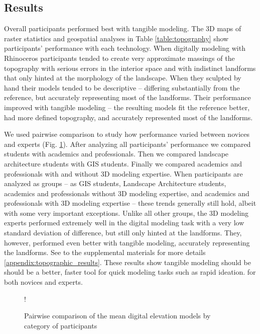 \documentclass[Afour,sagev,times]{sagej} %
\begin{document}
\subsection{Results}
Overall participants performed best with tangible modeling.
%
The 3D maps of raster statistics and geospatial analyses in
Table \ref{table:topography} 
show participants' performance with each technology.
%
When digitally modeling with Rhinoceros 
participants tended to 
create very approximate massings of the topography
with serious errors in the interior space and
with indistinct landforms
that only hinted at the morphology of the landscape.
%
When they sculpted by hand
their models tended to be descriptive -- 
differing substantially from the reference, but
accurately representing most of the landforms. 
%
Their performance improved 
with tangible modeling --
the resulting models
fit the reference better, 
had more defined topography, 
and accurately represented most of the landforms.

We used pairwise comparison to study 
how performance varied between 
novices and experts (Fig. \ref{fig:comparison}).
After analyzing all participants' performance
we compared students with academics and professionals. 
Then we compared landscape architecture students with GIS students.
Finally we compared academics and professionals 
with and without 3D modeling expertise.
%
When participants are analyzed as groups 
-- as GIS students, Landscape Architecture students, 
academics and professionals without 3D modeling expertise, 
and academics and professionals with 3D modeling expertise -- 
these trends generally still hold, 
albeit with some very important exceptions.
%
Unlike all other groups, 
the 3D modeling experts performed extremely well 
in the digital modeling task
with a very low standard deviation of difference, 
but still only hinted at the landforms. 
They, however, performed even better with tangible modeling,
accurately representing the landforms. 
%
See to the supplemental materials for more details
\ref{appendix:topographic_results}.
%
These results show 
tangible modeling should be 
should be a better, faster tool 
for quick modeling tasks such as rapid ideation. 
for both novices and experts.

\begin{figure}[t]
\resizebox {\textwidth} {!} {}
\caption{Pairwise comparison of the mean digital elevation models 
by category of participants}
\label{fig:comparison}
\end{figure}
\end{document}
